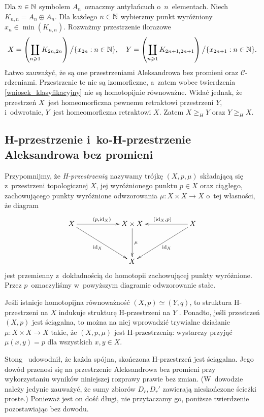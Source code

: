\begin{ex}
Dla $n\in\mathbb{N}$ symbolem $A_n$~oznaczmy antyłańcuch o~$n$~elementach. Niech $K_{n,n}=A_n\oplus A_n$. Dla każdego $n\in\mathbb{N}$ wybierzmy punkt wyróżniony $x_n\in \min(K_{n,n})$. Rozważmy przestrzenie ilorazowe \[X=\left(\coprod_{n\geqslant 1} K_{2n,2n}\right)\big/\{x_{2n}:n\in\mathbb{N}\},\quad Y=\left(\coprod_{n\geqslant 1} K_{2n+1,2n+1}\right)\big/\{x_{2n+1}:n\in\mathbb{N}\}.\] Łatwo zauważyć, że są one przestrzeniami Aleksandrowa bez promieni oraz \mbox{$\mathcal{C}$-rdzeniami}. Przestrzenie te nie są izomorficzne, a~zatem wobec twierdzenia \ref{wniosek_klasyfikacyjny} nie są homotopijnie równoważne. Widać jednak, że przestrzeń $X$~jest homeomorficzna pewnemu retraktowi przestrzeni $Y$, i~odwrotnie, $Y$~jest homeomorficzna retraktowi $X$. Zatem $X\geq_H Y$ oraz $Y\geq_H X$. 
\end{ex}




\subsection{H-przestrzenie i~ko-H-przestrzenie Aleksandrowa bez promieni}
Przypomnijmy, że \textit{H-przestrzenią} nazywamy trójkę $(X,p,\mu)$ składającą się z~przestrzeni topologicznej $X$, jej wyróżnionego punktu $p\in X$ oraz ciągłego, zachowującego punkty wyróżnione odwzorowania $\mu:X\times X\to X$ o~tej własności, że diagram \[\xymatrix@C=60pt@R=40pt{X\ar[dr]_{\id_X}\ar[r]^{(p,\id_X)} & X\times X\ar[d]^{\mu} & X\ar[dl]^{\id_X}\ar[l]_{(\id_X,p)} \\ & X}\]
jest przemienny z~dokładnością do homotopii zachowującej punkty wyróżnione. Przez $p$~oznaczyliśmy w~powyższym diagramie odwzorowanie stałe.

Jeśli istnieje homotopijna równoważność $(X,p)\simeq (Y,q)$, to struktura \mbox{H-przestrzeni} na $X$ indukuje strukturę \mbox{H-przestrzeni} na $Y$ \cite[Theorem 1.5.4]{Spanier81}. Ponadto, jeśli przestrzeń $(X,p)$ jest ściągalna, to można na niej wprowadzić trywialne działanie $\mu:X\times X\to X$ takie, że $(X,p,\mu)$ jest H-przestrzenią: wystarczy przyjąć $\mu(x,y)=p$ dla wszystkich $x,y\in X$.

Stong~\cite{Stong66} udowodnił, że każda spójna, skończona H-przestrzeń jest ściągalna. Jego dowód przenosi się na przestrzenie Aleksandrowa bez promieni przy wykorzystaniu wyników niniejszej rozprawy prawie bez zmian. (W~dowodzie \cite[Proposition 13]{Stong66} należy jedynie zauważyć, że sumy zbiorów $D_r, D_r'$ zawierają nieskończone ścieżki proste.) Ponieważ jest on dość długi, nie przytaczamy go, poniższe twierdzenie pozostawiając bez dowodu.

